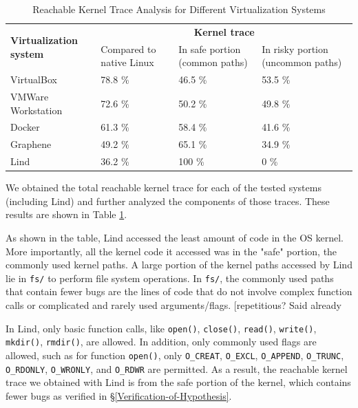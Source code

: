 {\begin{table}
\centering
\scriptsize
\caption{Reachable Kernel Trace Analysis for Different Virtualization
Systems}
\begin{tabular}{|l|l|l|l|}
  \hline
  \multirow{3}{1.5cm}{\bf Virtualization system} & \multicolumn{3}{c|}{\bf Kernel trace} \\ \cline{2-4}
  & \multirow{2}{1.5cm}{Compared to native Linux} & \multirow{2}{1.5cm}{In safe portion
  (common paths)} & \multirow{2}{1cm}{In risky portion (uncommon paths)} \\
  & & & \\  \hline
  VirtualBox & 78.8 \% & 46.5 \% & 53.5 \% \\
  \hline
  \multirow{2}{1.5cm}{VMWare Workstation} & \multirow{2}{*}{72.6 \%} &
  \multirow{2}{*}{50.2 \%} & \multirow{2}{*}{49.8 \%} \\
  & & & \\   \hline
  Docker & 61.3 \% & 58.4 \% & 41.6 \% \\
  \hline
  Graphene & 49.2 \% & 65.1 \% & 34.9 \% \\
  \hline
  Lind & 36.2 \% & 100 \% & 0 \% \\
  \hline
\end{tabular}
\label{table:trace-systems}
\end{table}

We obtained the total reachable kernel trace for
each of the tested systems (including Lind)
and further analyzed the components of those traces. These results
are shown in Table \ref{table:trace-systems}.

As shown in the table, Lind accessed the least amount of code in the OS
kernel. More importantly,
all the kernel code it accessed was in the "safe" portion, the
commonly used kernel paths.
A large portion of the kernel paths accessed by Lind lie in
\texttt{fs/} to perform file system operations.
In \texttt{fs/}, the commonly used paths that contain
fewer bugs are the lines of code that do not involve complex function calls
or complicated and rarely used arguments/flags. \lois[repetitious? Said already}
In Lind, only basic function calls,
like \texttt{open()}, \texttt{close()}, \texttt{read()}, \texttt{write()}, \texttt{mkdir()},
\texttt{rmdir()}, are allowed. In addition, only commonly used flags are allowed, such as
for function \texttt{open()}, only
\texttt{O\_CREAT}, \texttt{O\_EXCL}, \texttt{O\_APPEND}, \texttt{O\_TRUNC},
\texttt{O\_RDONLY}, \texttt{O\_WRONLY}, and \texttt{O\_RDWR} are permitted.
As a result, the reachable kernel trace we obtained with Lind is from the safe
portion of the kernel, which contains fewer bugs
as verified in \S{\ref{Verification-of-Hypothesis}}.

